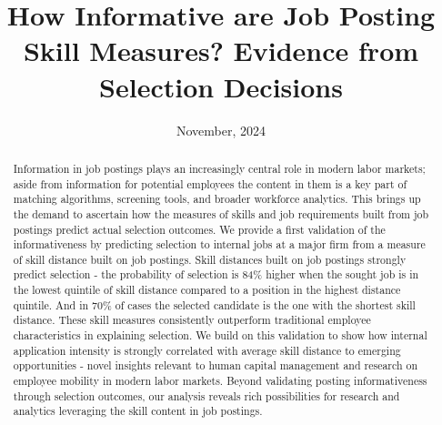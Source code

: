 \documentclass[12pt]{article}
\title{How Informative are Job Posting Skill Measures? Evidence from Selection Decisions}
\author{} %
\date{November, 2024} %
\begin{document}
\maketitle

{%
\linespread{1.5}\selectfont
\begin{abstract}
Information in job postings plays an increasingly central role in modern labor markets; aside from information for potential employees the content in them is a key part of matching algorithms, screening tools, and broader workforce analytics. This brings up the demand to ascertain how the measures of skills and job requirements built from job postings predict actual selection outcomes. We provide a first validation of the informativeness by predicting selection to internal jobs at a major firm from a measure of skill distance built on job postings. Skill distances built on job postings strongly predict selection - the probability of selection is 84\% higher when the sought job is in the lowest quintile of skill distance compared to a position in the highest distance quintile. And in 70\% of cases the selected candidate is the one with the shortest skill distance. These skill measures consistently outperform traditional employee characteristics in explaining selection. We build on this validation to show how internal application intensity is strongly correlated with average skill distance to emerging opportunities - novel insights relevant to human capital management and research on employee mobility in modern labor markets. Beyond validating posting informativeness through selection outcomes, our analysis reveals rich possibilities for research and analytics leveraging the skill content in job postings. 

\end{abstract}
} %

\newpage
\end{document}

